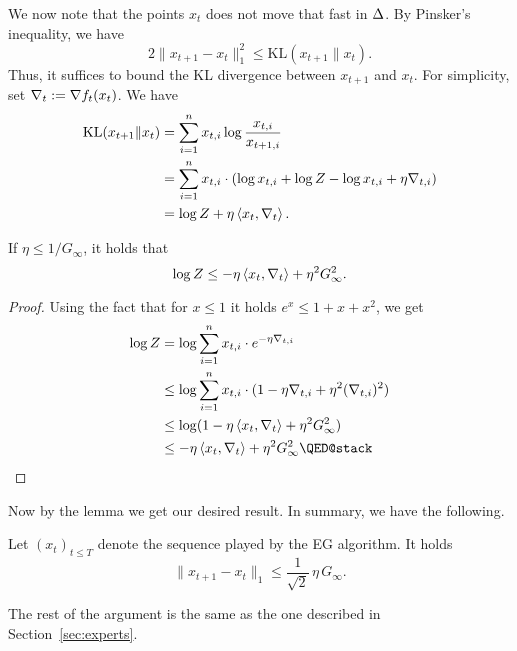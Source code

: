We now note that the points $x_t$ does not move that fast in $\Delta$. By Pinsker's inequality, we have
\[
    2\|x_{t+1} - x_t\|_1^2 \leq \mathrm{KL}(x_{t+1}\|x_t).
\]
Thus, it suffices to bound the KL divergence between $x_{t+1}$ and $x_t$. For simplicity, set $\nabla_t := \nabla f_t(x_t)$. We have
\begin{align*}
    \mathrm{KL}(x_{t+1}\|x_t) &= \sum_{i=1}^n x_{t,i} \log\frac{x_{t,i}}{x_{{t+1},i}} \\
                              &= \sum_{i=1}^n x_{t,i} \cdot (\log x_{t,i} + \log Z - \log x_{t,i} + \eta \nabla_{t,i}) \\
                              &= \log Z + \eta \left\langle x_t,\nabla_t \right\rangle.
\end{align*}
\begin{lemma}
    If $\eta \leq 1/G_\infty$, it holds that
    \[
        \log Z \leq -\eta\left\langle x_t,\nabla_t \right\rangle + \eta^2 G_\infty^2.
    \]
\end{lemma}
\begin{proof}
    Using the fact that for $x \leq 1$ it holds $e^x \leq 1 + x + x^2$, we get
    \begin{align*}
        \log Z &= \log \sum_{i=1}^n x_{t,i} \cdot e^{-\eta \grad_{t,i}} \\
               &\leq \log \sum_{i=1}^n x_{t,i}\cdot (1 - \eta\grad_{t,i} + \eta^2(\grad_{t,i})^2) \\
               &\leq \log (1 - \eta\inner{x_t}{\grad_t} + \eta^2G_\infty^2) \\
               &\leq - \eta\inner{x_t}{\grad_t} + \eta^2G_\infty^2 \qedhere
    \end{align*}
\end{proof}

Now by the lemma we get our desired result. In summary, we have the following.
\begin{proposition}
    Let $(x_t)_{t\leq T}$ denote the sequence played by the EG algorithm. It holds
    \[
        \|x_{t+1} - x_t\|_1 \leq \frac{1}{\sqrt{2}}\,\eta\, G_\infty.
    \]
\end{proposition}

The rest of the argument is the same as the one described in Section~\ref{sec:experts}.
